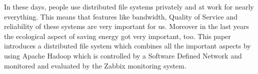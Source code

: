 



In these days, people use distributed file systems privately and at work for nearly everything. This means that features like bandwidth, Quality of Service and reliability of these systems are very important for us. Moreover in the last years the ecological aspect of saving energy got very important, too. This paper introduces a distributed file system which combines all the important aspects by using Apache Hadoop\textsuperscript{\textregistered} which is controlled by a Software Defined Network and monitored and evaluated by the Zabbix monitoring system.      